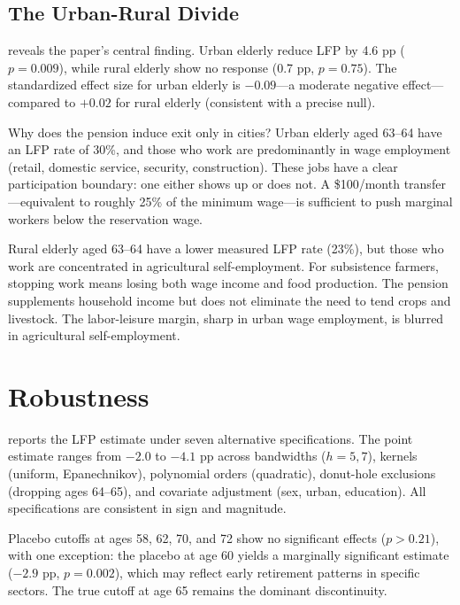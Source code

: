 \documentclass[12pt]{article}
\begin{document}


\subsection{The Urban-Rural Divide}

 reveals the paper's central finding. Urban elderly reduce LFP by 4.6 pp ($p = 0.009$), while rural elderly show no response (0.7 pp, $p = 0.75$). The standardized effect size for urban elderly is $-0.09$---a moderate negative effect---compared to $+0.02$ for rural elderly (consistent with a precise null).

Why does the pension induce exit only in cities? Urban elderly aged 63--64 have an LFP rate of 30\%, and those who work are predominantly in wage employment (retail, domestic service, security, construction). These jobs have a clear participation boundary: one either shows up or does not. A \$100/month transfer---equivalent to roughly 25\% of the minimum wage---is sufficient to push marginal workers below the reservation wage.

Rural elderly aged 63--64 have a lower measured LFP rate (23\%), but those who work are concentrated in agricultural self-employment. For subsistence farmers, stopping work means losing both wage income and food production. The pension supplements household income but does not eliminate the need to tend crops and livestock. The labor-leisure margin, sharp in urban wage employment, is blurred in agricultural self-employment.




\section{Robustness}
\label{sec:robustness}

 reports the LFP estimate under seven alternative specifications. The point estimate ranges from $-2.0$ to $-4.1$ pp across bandwidths ($h = 5, 7$), kernels (uniform, Epanechnikov), polynomial orders (quadratic), donut-hole exclusions (dropping ages 64--65), and covariate adjustment (sex, urban, education). All specifications are consistent in sign and magnitude.

Placebo cutoffs at ages 58, 62, 70, and 72 show no significant effects ($p > 0.21$), with one exception: the placebo at age 60 yields a marginally significant estimate ($-2.9$ pp, $p = 0.002$), which may reflect early retirement patterns in specific sectors. The true cutoff at age 65 remains the dominant discontinuity.
\end{document}
